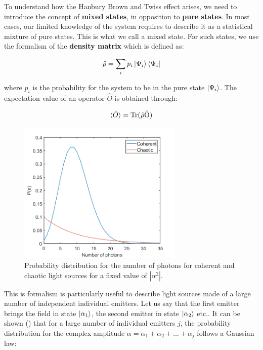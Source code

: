 To understand how the Hanbury Brown and Twiss effect arises, we need to introduce the concept of \textbf{mixed states}, in opposition to \textbf{pure states}. In most cases, our limited knowledge of the system requires to describe it as a statistical mixture of pure states. This is what we call a mixed state. For such states, we use the formalism of the \textbf{density matrix} which is defined as:

\begin{equation}
    \hat{\rho} = \sum_{i} p_i \ket{\Psi_i} \bra{\Psi_i}
\end{equation}

\noindent where $p_i$ is the probability for the system to be in the pure state $\ket{\Psi_i}$. The expectation value of an operator $\hat{O}$ is obtained through:

\begin{equation}
    \langle\hat{O}\rangle = \rm{Tr}(\hat{\rho} \hat{O})
\end{equation}

\begin{figure}
    \centering
    \includegraphics[width=0.7\textwidth]{Fig/Chapter1/coherent_vs_chaotic.png}
    \caption[Probability distribution for the number of photons for coherent and chaotic light sources]{Probability distribution for the number of photons for coherent and chaotic light sources for a fixed value of $|\alpha^2|$.}
    \label{fig:light_statistics}
\end{figure}

This is formalism is particularly useful to describe light sources made of a large number of independent individual emitters. Let us say that the first emitter brings the field in state $\ket{\alpha_1}$, the second emitter in state $\ket{\alpha_2}$ etc.. It can be shown (\cite{glauber1963coherent}) that for a large number of individual emitters $j$, the probability distribution for the complex amplitude $\alpha=\alpha_1 + \alpha_2 + ... + \alpha_j$ follows a Gaussian law:

